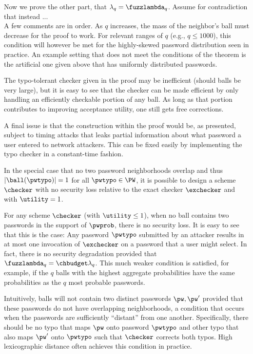 Now we prove the other part, that $\lambda_q = \fuzzlambda_q$. Assume for
contradiction that instead ... 
\qedsym\\

A few comments are in order.  As $q$ increases, the mass of the neighbor's ball
must decrease for the proof to work. For relevant ranges of $q$ (e.g., $q \le
1000$), this condition will however be met for the highly-skewed password
distribution seen in practice.  An
example setting that does not meet the conditions of the theorem is the
artificial one given above that has uniformly distributed passwords. %

The typo-tolerant checker given in the proof may be inefficient (should balls be
very large), but it is easy to see that the checker can be made efficient by
only handling an efficiently checkable portion of any ball.  As long as that
portion contributes to improving acceptance utility, one still gets free
corrections.

A final issue is that the construction within the proof would be, as presented,
subject to timing attacks that leaks partial information about what password a user
entered to network attackers. This can be fixed easily by implementing the typo
checker in a constant-time fashion.

\iffalse
In the special case that no two password neighborhoods overlap and thus $|\ball(\pwtypo)| = 1$ for all $\pwtypo \in \PW$, it is possible to design a scheme $\checker$ with no security loss relative to the exact checker $\exchecker$ and with $\utility = 1$.

For any scheme $\checker$ (with $\utility \leq 1$), when no ball contains two passwords in the support of $\pwprob$, there is no security loss. It is easy to see that this is the case: Any password $\pwtypo$ submitted by an attacker results in at most one invocation of $\exchecker$ on a password that a user might select. In fact, there is no security degradation provided that $\fuzzlambda_q = \chbudget \lambda_q$. This much weaker condition is satisfied, for example, if the $q$ balls with the highest aggregate probabilities have the same probabilities as the $q$ most probable passwords. 

Intuitively, balls will not contain two distinct passwords $\pw, \pw'$ provided that these passwords do not have overlapping neighborhoods, a condition that occurs when the passwords are sufficiently ``distant'' from one another. Specifically, there should be no typo that maps $\pw$ onto password $\pwtypo$ and other typo that also maps $\pw'$ onto $\pwtypo$ such that $\checker$ corrects both typos. High lexicographic distance often achieves this condition in practice.

